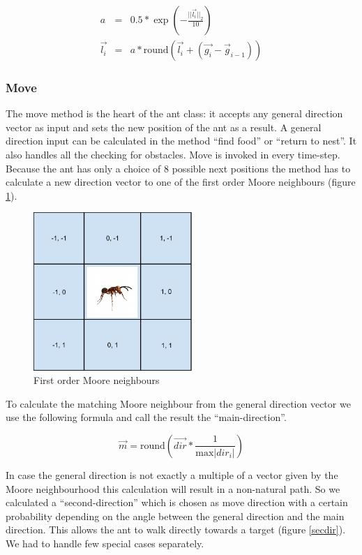 \documentclass[11pt]{article}
\begin{document}
\begin{eqnarray}
a & = & 0.5 * \exp \left(-\frac{||\vec{l_i}||_2}{10}\right) \\
\vec{l_i} & = & a * \text{round} \left(\vec{l_i}  + \left(\vec{g_i} - {\vec{g}_{i-1}}\right)\right)
\end{eqnarray}

\subsubsection{Move}
The move method is the heart of the ant class: it accepts any general direction vector as input and sets the new position of the ant as a result. A general direction input can be calculated in the method “find food” or “return to nest”. It also handles all the checking for obstacles. Move is invoked in every time-step. Because the ant has only a choice of 8 possible next positions the method has to calculate a new direction vector to one of the first order Moore neighbours (figure \ref{moore}).
\begin{figure}
\centering
\includegraphics[width=6cm]{images/Mooreneighbours.pdf}
\caption[First order moore neighbours]{First order Moore neighbours}
\label{moore}
\end{figure}

To calculate the matching Moore neighbour from the general direction vector we use the following formula and call the result the “main-direction”.

\begin{equation}
\vec{m} = \text{round}\left(\vec{dir}*\frac{1}{\text{max}|dir_i|}\right)
\end{equation}

In case the general direction is not exactly a multiple of a vector given by the Moore neighbourhood this calculation will result in a non-natural path. So we calculated a “second-direction” which is chosen as move direction with a certain probability depending on the angle between the general direction and the main direction. This allows the ant to walk directly towards a target (figure \ref{secdir}). We had to handle few special cases separately.
\end{document}
